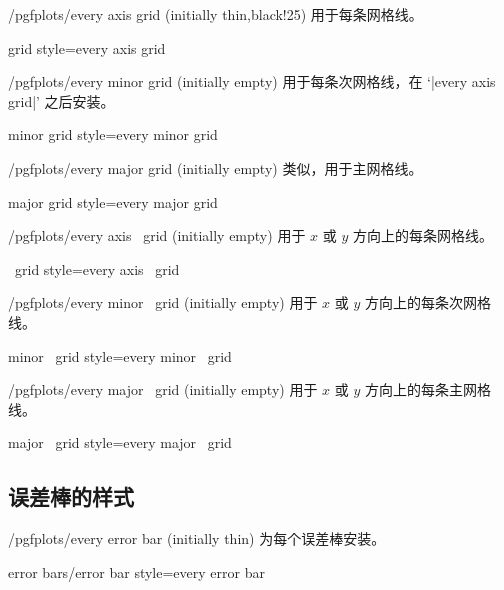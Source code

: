 \begin{stylekey}{/pgfplots/every axis grid (initially thin,black!25)}
    用于每条网格线。
\end{stylekey}

\pgfplotsshortstylekey grid style=every axis grid\pgfeov

\begin{stylekey}{/pgfplots/every minor grid (initially empty)}
    用于每条次网格线，在 `|every axis grid|' 之后安装。
\end{stylekey}

\pgfplotsshortstylekey minor grid style=every minor grid\pgfeov

\begin{stylekey}{/pgfplots/every major grid (initially empty)}
    类似，用于主网格线。
\end{stylekey}

\pgfplotsshortstylekey major grid style=every major grid\pgfeov

\begin{xystylekey}{/pgfplots/every axis \x\ grid (initially empty)}
    用于 $x$ 或 $y$ 方向上的每条网格线。
\end{xystylekey}

\pgfplotsshortxystylekey \x\ grid style=every axis \x\ grid\pgfeov

\begin{xystylekey}{/pgfplots/every minor \x\ grid (initially empty)}
    用于 $x$ 或 $y$ 方向上的每条次网格线。
\end{xystylekey}

\pgfplotsshortxystylekey minor \x\ grid style=every minor \x\ grid\pgfeov

\begin{xystylekey}{/pgfplots/every major \x\ grid (initially empty)}
    用于 $x$ 或 $y$ 方向上的每条主网格线。
\end{xystylekey}

\pgfplotsshortxystylekey major \x\ grid style=every major \x\ grid\pgfeov


\subsection*{误差棒的样式}

\begin{stylekey}{/pgfplots/every error bar (initially thin)}
    为每个误差棒安装。
\end{stylekey}

\pgfplotsshortstylekey error bars/error bar style=every error bar\pgfeov


